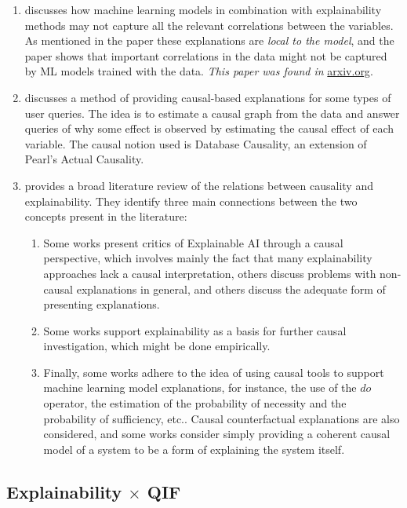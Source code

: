 \begin{enumerate}
\item \cite{vowels2022trying} discusses how machine learning models in combination with explainability methods may not capture all the relevant correlations between the variables. As mentioned in the paper these explanations are \emph{local to the model}, and the paper shows that important correlations in the data might not be captured by ML models trained with the data. \emph{This paper was found in }\url{arxiv.org}.
\item \cite{ma2023xinsight} discusses a method of providing causal-based explanations for some types of user queries. The idea is to estimate a causal graph from the data and answer queries of why some effect is observed by estimating the causal effect of each variable. The causal notion used is Database Causality, an extension of Pearl's Actual Causality.
\item \cite{carloni2023role} provides a broad literature review of the relations between causality and explainability. They identify three main connections between the two concepts present in the literature: \begin{enumerate}
    \item Some works present critics of Explainable AI through a causal perspective, which involves mainly the fact that many explainability approaches lack a causal interpretation, others discuss problems with non-causal explanations in general, and others discuss the adequate form of presenting explanations.
    \item Some works support explainability as a basis for further causal investigation, which might be done empirically.
    \item Finally, some works adhere to the idea of using causal tools to support machine learning model explanations, for instance, the use of the $do$ operator, the estimation of the probability of necessity and the probability of sufficiency, etc.. Causal counterfactual explanations are also considered, and some works consider simply providing a coherent causal model of a system to be a form of explaining the system itself.
    \end{enumerate}
\end{enumerate}

\subsection{Explainability $\times$ QIF}

